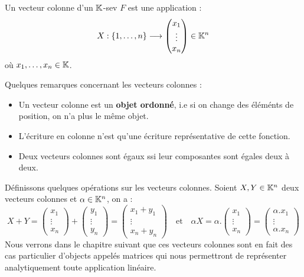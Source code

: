\begin{definition}
    Un vecteur colonne d'un $\mathbb{K}$-sev $F$ est une application : 
        \[ X : \{1, \dots , n\} \longrightarrow 
        \begin{pmatrix}
            x_1 \\ 
            \vdots \\ 
            x_n 
        \end{pmatrix} \in \mathbb{K}^n \] 
    où $ x_1, \dots , x_n \in \mathbb{K}$. 
\end{definition}

\begin{remark}
    Quelques remarques concernant les vecteurs colonnes : 
    \begin{itemize}
        \item Un vecteur colonne est un \textbf{objet ordonné}, i.e si on change des éléménts de position, on n'a plus 
        le même objet. 
        \item L'écriture en colonne n'est qu'une écriture représentative de cette fonction. 
        \item Deux vecteurs colonnes sont égaux ssi leur composantes sont égales deux à deux. 
    \end{itemize}
\end{remark}

\begin{proposition}
    Définissons quelques opérations sur les vecteurs colonnes. 
    Soient $X,Y \in \mathbb{K}^n$ deux vecteurs colonnes et $ \alpha \in \mathbb{K}^n$, on a : 
        \[ X + Y = 
        \begin{pmatrix}
            x_1 \\ 
            \vdots \\ 
            x_n 
        \end{pmatrix}
        + 
        \begin{pmatrix}
            y_1 \\ 
            \vdots \\ 
            y_n 
        \end{pmatrix}
        = 
        \begin{pmatrix}
            x_1 + y_1 \\ 
            \vdots \\ 
            x_n + y_n 
        \end{pmatrix}
        \quad \text{et} \quad 
        \alpha X = \alpha . 
        \begin{pmatrix}
            x_1 \\ 
            \vdots \\ 
            x_n 
        \end{pmatrix}
        = 
        \begin{pmatrix}
            \alpha . x_1 \\ 
            \vdots \\ 
            \alpha . x_n 
        \end{pmatrix} \] 
    Nous verrons dans le chapitre suivant que ces vecteurs colonnes sont en fait des cas particulier d'objects appelés 
    matrices qui nous permettront de représenter analytiquement toute application linéaire. 
\end{proposition}


